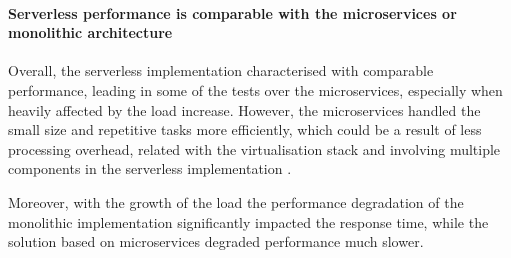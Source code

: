 
\paragraph{Serverless performance is comparable with the microservices or monolithic architecture}

Overall, the serverless implementation characterised with comparable performance, leading in some of the tests over the microservices, especially when heavily affected by the load increase.
However, the microservices handled the small size and repetitive tasks more efficiently, which could be a result of less processing overhead, related with the virtualisation stack and involving multiple components in the serverless implementation \cite{MicroservicesvsServerlessAPerformanceComparisonOnCloudNativeWebApplication}.

Moreover, with the growth of the load the performance degradation of the monolithic implementation significantly impacted the response time, while the solution based on microservices degraded performance much slower. \cite{ServerlessComputingAnInvestigationOfDeploymentEnvironmentsForWebAPIs}






